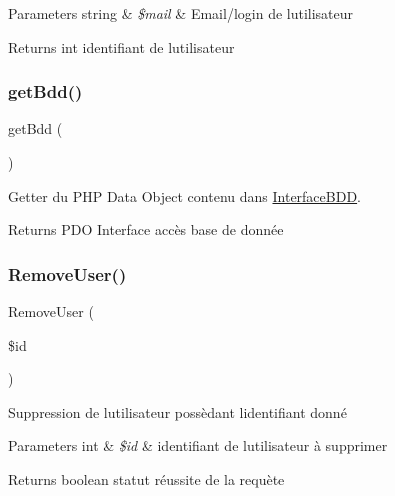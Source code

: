 \begin{DoxyParams}[1]{Parameters}
string & {\em \$mail} & Email/login de l\textquotesingle{}utilisateur\\
\hline
\end{DoxyParams}
\begin{DoxyReturn}{Returns}
int identifiant de l\textquotesingle{}utilisateur 
\end{DoxyReturn}
\mbox{\label{class_interface_b_d_d_af3c2403a2cce83d85a2e494534115ddb}} 
\subsubsection{\texorpdfstring{get\+Bdd()}{getBdd()}}
{\footnotesize\ttfamily get\+Bdd (\begin{DoxyParamCaption}{ }\end{DoxyParamCaption})}



Getter du P\+HP Data Object contenu dans \mbox{\hyperlink{class_interface_b_d_d}{Interface\+B\+DD}}. 

\begin{DoxyReturn}{Returns}
P\+DO Interface accès base de donnée 
\end{DoxyReturn}
\mbox{\label{class_interface_b_d_d_a1ce1781e4e653de271446486898f360e}} 
\subsubsection{\texorpdfstring{Remove\+User()}{RemoveUser()}}
{\footnotesize\ttfamily Remove\+User (\begin{DoxyParamCaption}\item[{}]{\$id }\end{DoxyParamCaption})}



Suppression de l\textquotesingle{}utilisateur possèdant l\textquotesingle{}identifiant donné 


\begin{DoxyParams}[1]{Parameters}
int & {\em \$id} & identifiant de l\textquotesingle{}utilisateur à supprimer\\
\hline
\end{DoxyParams}
\begin{DoxyReturn}{Returns}
boolean statut réussite de la requète 
\end{DoxyReturn}
\mbox{\label{class_interface_b_d_d_aaadfadb8a0a987f3d7a82dc3207e80f6}} 
